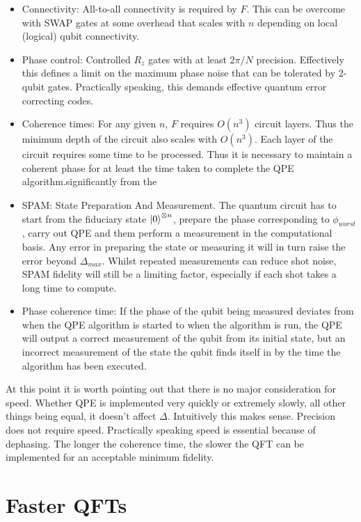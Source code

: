 \documentclass{book}
\begin{document}
\begin{itemize}
   \item Connectivity: All-to-all connectivity is required by $F$. This can be overcome with SWAP gates at some overhead that scales with $n$ depending on local (logical) qubit connectivity.
   \item Phase control: Controlled $R_z$ gates with at least $2\pi/N$ precision. Effectively this defines a limit on the maximum phase noise that can be tolerated by 2-qubit gates. Practically speaking, this demands effective quantum error correcting codes.
   \item Coherence times: For any given $n$, $F$ requires $O(n^3)$ circuit layers. Thus the minimum depth of the circuit also scales with $O(n^3)$. Each layer of the circuit requires some time to be processed. Thus it is necessary to maintain a coherent phase for at least the time taken to complete the QPE algorithm.significantly from the  
   \item SPAM: State Preparation And Measurement. The quantum circuit has to start from the fiduciary state $\ket{0}^{\otimes n}$, prepare the phase corresponding to $\phi_{worst}$, carry out QPE and them perform a measurement in the computational basis. Any error in preparing the state or measuring it will in turn raise the error beyond $\Delta_{max}$. Whilst repeated measurements can reduce shot noise, SPAM fidelity will still be a limiting factor, especially if each shot takes a long time to compute.
   \item Phase coherence time: If the phase of the qubit being measured deviates from when the QPE algorithm is started to when the algorithm is run, the QPE will output a correct measurement of the qubit from its initial state, but an incorrect measurement of the state the qubit finds itself in by the time the algorithm has been executed. 
\end{itemize}

At this point it is worth pointing out that there is no major consideration for speed. Whether QPE is implemented very quickly or extremely slowly, all other things being equal, it doesn't affect $\Delta $. Intuitively this makes sense. Precision does not require speed. Practically speaking speed is essential because of dephasing. The longer the coherence time, the slower the QFT can be implemented for an acceptable minimum fidelity. 

\section{Faster QFTs}
\end{document}

